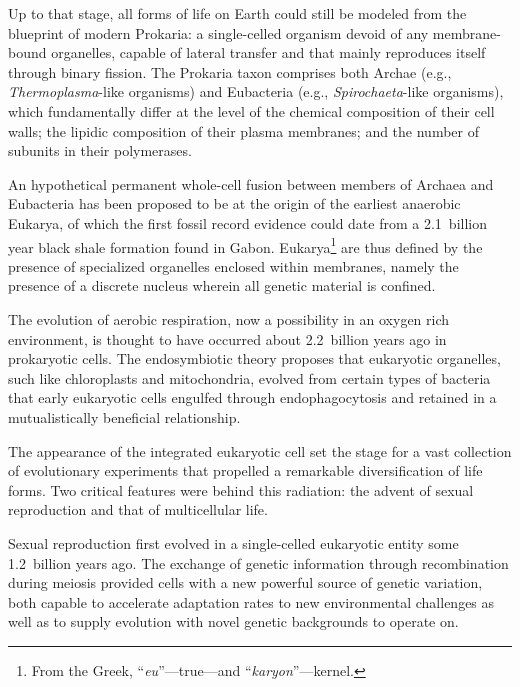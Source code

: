 \documentclass{tufte-book}
\begin{document}


Up to that stage, all forms of life on Earth could still be modeled from the
blueprint of modern Prokaria: a \mbox{single-celled} organism devoid of any
\mbox{membrane-bound} organelles, capable of lateral  transfer and
that mainly reproduces itself through binary fission.  The Prokaria taxon
comprises both Archae (e.g., \mbox{\emph{Thermoplasma}-like} organisms) and
Eubacteria (e.g., \mbox{\emph{Spirochaeta}-like} organisms), which fundamentally
differ at the level of the chemical composition of their cell walls; the lipidic
composition of their plasma membranes; and the number of subunits in their
 polymerases.

An hypothetical permanent \mbox{whole-cell} fusion between members of Archaea
and Eubacteria has been proposed to be at the origin of the earliest anaerobic
Eukarya,\cite{margulis_archaeal-eubacterial_1996} of which the first fossil
record evidence could date from a 2.1~billion year black shale formation found
in Gabon.\cite{albani_large_2010} Eukarya\footnote{From the Greek,
  ``\emph{eu}''---true---and ``\emph{karyon}''---kernel.} are thus defined by
the presence of specialized organelles enclosed within membranes, namely the
presence of a discrete nucleus wherein all genetic material is confined.

The evolution of aerobic respiration, now a possibility in an oxygen rich
environment, is thought to have occurred about 2.2~billion years ago in
prokaryotic cells.  The endosymbiotic theory proposes that eukaryotic
organelles, such like chloroplasts and mitochondria, evolved from certain types
of bacteria that early eukaryotic cells engulfed through endophagocytosis and
retained in a mutualistically beneficial relationship.

The appearance of the integrated eukaryotic cell set the stage for a vast
collection of evolutionary experiments that propelled a remarkable
diversification of life forms.  Two critical features were behind this
radiation: the advent of sexual reproduction and that of multicellular life.

Sexual reproduction first evolved in a \mbox{single-celled} eukaryotic entity
some 1.2~billion years ago.\cite{bernstein_dna_2012} The exchange of genetic
information through recombination during meiosis provided cells with a new
powerful source of genetic variation, both capable to accelerate adaptation
rates to new environmental challenges as well as to supply evolution with novel
genetic backgrounds to operate on.\cite{burt_perspective:_2000}
\end{document}
